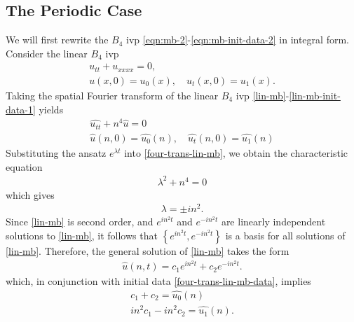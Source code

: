 \documentclass[12pt,reqno]{amsart}
\numberwithin{equation}{section}  %
\numberwithin{figure}{section}
\newcommand{\wh}{\widehat}
\theoremstyle{plain}
\theoremstyle{definition}
\theoremstyle{remark}
\begin{document}
\subsection{The Periodic Case} 
\label{ssec:periodic-case}
We will first rewrite the $B_4$ ivp
\eqref{eqn:mb-2}-\eqref{eqn:mb-init-data-2} in integral form. 
Consider
the linear $B_4$ ivp
\begin{gather}
  u_{tt} + u_{xxxx} = 0,
  \label{lin-mb}
  \\
  u(x, 0)=u_{0}(x), \quad u_{t}(x,0) = u_{1}(x).
  \label{lin-mb-init-data-1}
\end{gather}
Taking the spatial Fourier transform of the linear $B_{4}$ ivp
\eqref{lin-mb}-\eqref{lin-mb-init-data-1} yields
%
%
\begin{gather}
  \wh{u_{tt}} + n^{4} \wh{u} = 0
  \label{four-trans-lin-mb}
  \\
  \wh{u}(n, 0) = \wh{u_{0}}(n), \quad \wh{u_{t}}(n, 0) = \wh{u_{1}}(n)
  \label{four-trans-lin-mb-data}
\end{gather}
Substituting the ansatz $e^{\lambda t}$ into \eqref{four-trans-lin-mb}, we
obtain the characteristic equation
%
%
\begin{equation*}
\begin{split}
  \lambda^{2} + n^{4} = 0
\end{split}
\end{equation*}
%
%
which gives 
%
%
\begin{equation*}
\begin{split}
  \lambda = \pm in^{2}.
\end{split}
\end{equation*}
%
Since
\eqref{lin-mb} is second order, and $e^{in^{2}t}$ and $e^{-in^{2}t}$ are
linearly independent solutions to \eqref{lin-mb}, it follows that $\left\{
e^{in^{2}t}, e^{-in^{2}t}
\right\}$ is a basis for all solutions of \eqref{lin-mb}. Therefore, the general
solution of \eqref{lin-mb} takes the form
%
%
\begin{equation}
  \label{explicit-homog-soln}
\begin{split}
  \wh{u}(n,t) = c_{1}e^{in^{2}t} + c_{2}e^{-in^{2}t}.
\end{split}
\end{equation}
%
%
which, in conjunction with initial data 
\eqref{four-trans-lin-mb-data}, implies
%
%
\begin{gather*}
   c_{1} + c_{2} = \wh{u_{0}}(n)
  \\
   in^{2}c_{1} - in^{2}c_{2} = \wh{u_{1}}(n).
\end{gather*}
\end{document}
